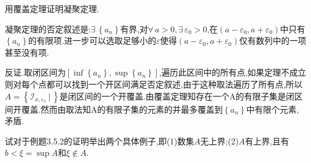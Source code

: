 \documentclass[cn,chinese,founder]{elegantbook}
\begin{document}
      \begin{exercise}
          用覆盖定理证明凝聚定理.
      \end{exercise}
      \begin{solution}
          凝聚定理的否定叙述是:$\exists\, \left\{a_n\right\}$有界,对$\forall\, a>0,\exists\, \varepsilon_0>0$,在$\left(a-\varepsilon_0,a+\varepsilon_0\right)$中只有$\left\{a_n\right\}$的有限项.进一步可以选取足够小的$\varepsilon$使得$\left(a-\varepsilon_0,a+\varepsilon_0\right)$仅有数列中的一项甚至没有项.

          反证.取闭区间为$\left[\inf\left\{a_n\right\},\sup\left\{a_n\right\}\right]$,遍历此区间中的所有点,如果定理不成立则对每个点都可以找到一个开区间满足否定叙述,由于这种取法遍历了所有点,所以$A=\left\{\mathcal{I}_{x,\varepsilon_x}\, |\, \right\}$是闭区间的一个开覆盖.由覆盖定理知存在一个A的有限子集是闭区间开覆盖.然而由取法知A的有限子集的元素的并最多覆盖到$\left\{a_n\right\}$中有限个元素,矛盾.
      \end{solution}

      \begin{exercise}
          试对于例题3.5.2的证明举出两个具体例子,即(1)数集$A$无上界;(2)$A$有上界,且有$b<\xi =\sup A$和$\xi \notin A$.
      \end{exercise}
      \begin{solution}
          
      \end{solution}
\end{document}
